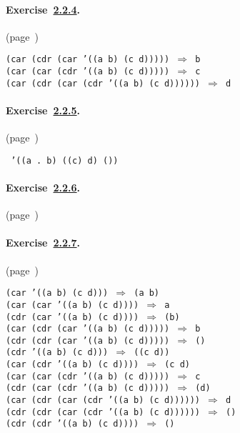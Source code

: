 \paragraph{Exercise \hyperref[start_g10]{2.2.4}. }(page \pageref{start_s37})

  
\begin{alltt}
 (car (cdr (car '((a b) (c d))))) \(\Rightarrow\) b
 (car (car (cdr '((a b) (c d))))) \(\Rightarrow\) c
 (car (cdr (car (cdr '((a b) (c d)))))) \(\Rightarrow\) d
\end{alltt}



\paragraph{Exercise \hyperref[start_g11]{2.2.5}. }(page \pageref{start_s38})

  
\texttt{ '((a . b) ((c) d) ())}


\paragraph{Exercise \hyperref[start_g12]{2.2.6}. }(page \pageref{start_s39})

  \begin{figure}[H]
\centering

\end{figure}
 


\paragraph{Exercise \hyperref[start_g13]{2.2.7}. }(page \pageref{start_s40})

  
\begin{alltt}
 (car '((a b) (c d))) \(\Rightarrow\) (a b)
 (car (car '((a b) (c d)))) \(\Rightarrow\) a
 (cdr (car '((a b) (c d)))) \(\Rightarrow\) (b)
 (car (cdr (car '((a b) (c d))))) \(\Rightarrow\) b
 (cdr (cdr (car '((a b) (c d))))) \(\Rightarrow\) ()
 (cdr '((a b) (c d))) \(\Rightarrow\) ((c d))
 (car (cdr '((a b) (c d)))) \(\Rightarrow\) (c d)
 (car (car (cdr '((a b) (c d))))) \(\Rightarrow\) c
 (cdr (car (cdr '((a b) (c d))))) \(\Rightarrow\) (d)
 (car (cdr (car (cdr '((a b) (c d)))))) \(\Rightarrow\) d
 (cdr (cdr (car (cdr '((a b) (c d)))))) \(\Rightarrow\) ()
 (cdr (cdr '((a b) (c d)))) \(\Rightarrow\) ()
\end{alltt}



